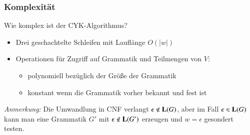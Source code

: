 \documentclass[onlymath]{beamer}
\begin{document}
\begin{frame}\frametitle{Komplexität}

\alert{Wie komplex ist der CYK-Algorithmus?}
\begin{itemize}
\item Drei geschachtelte Schleifen mit Lauflänge $O(|w|)$
\item Operationen für Zugriff auf Grammatik und Teilmengen von $V$:%
\begin{itemize}
\item polynomiell bezüglich der Größe der Grammatik
\item konstant wenn die Grammatik vorher bekannt und fest ist
\end{itemize}
\end{itemize}\bigskip

\bigskip

\emph{Anmerkung:} Die Umwandlung in CNF verlangt $\epsilon\notin\textbf{\textcolor{black}{L}}(G)$, aber 
im Fall $\epsilon\in\textbf{\textcolor{black}{L}}(G)$ kann man eine Grammatik $G'$ mit $\epsilon\notin\textbf{\textcolor{black}{L}}(G')$ erzeugen und
$w=\epsilon$ gesondert testen.

\end{frame}

\newcommand{\colcell}[2]{\only<#1|handout:0>{\cellcolor{#2}}}
\end{document}
